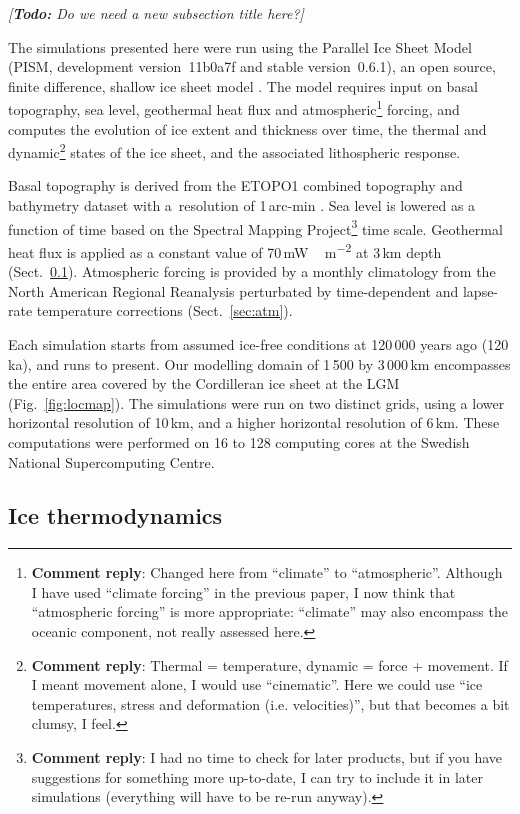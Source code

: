 \documentclass[tc, manuscript]{copernicus}
\newcommand{\renote}[1]{\footnote{\textbf{Comment reply}: #1}}
\newcommand{\todo}[1]{\emph{[\textbf{Todo:} #1]}}
\begin{document}
\todo{Do we need a new subsection title here?}

The simulations presented here were run using the Parallel Ice Sheet Model
(PISM, development version~11b0a7f and stable version~0.6.1), an open source,
finite difference, shallow ice sheet model \citep{PISM-authors.2014}. The model
requires input on basal topography, sea level, geothermal heat flux and
atmospheric\renote{
    Changed here from ``climate'' to ``atmospheric''. Although I have used
    ``climate forcing'' in the previous paper, I now think that ``atmospheric
    forcing'' is more appropriate: ``climate'' may also encompass the oceanic
    component, not really assessed here.}
forcing, and computes the evolution of ice extent
and thickness over time, the thermal and dynamic\renote{
    Thermal = temperature, dynamic = force + movement. If I meant movement
    alone, I would use ``cinematic''. Here we could use ``ice temperatures,
    stress and deformation (i.e. velocities)'', but that becomes a bit clumsy,
    I feel.}
states of the ice sheet, and the associated lithospheric response.

Basal topography is derived from the ETOPO1 combined topography and bathymetry
dataset with a~resolution of 1\,arc-min \citep{Amante.Eakins.2009}. Sea level
is lowered as a function of time based on the Spectral Mapping Project\renote{
    I had no time to check for later products, but if you have suggestions for
    something more up-to-date, I can try to include it in later simulations
    (everything will have to be re-run anyway).}
\citep[SPECMAP;][]{Imbrie.etal.1989} time scale. Geothermal heat flux
is applied as a constant value of 70\,\unit{mW\,m^{-2}} at 3\,km depth
(Sect.~\ref{sec:icedyn}). Atmospheric forcing is provided by a monthly
climatology from the North American Regional Reanalysis
\citep[NARR;][]{Mesinger.etal.2006} perturbated by time-dependent and
lapse-rate temperature corrections (Sect.~\ref{sec:atm}).

Each simulation starts from assumed ice-free conditions at 120\,000 years ago
(120\,ka), and runs to present. Our modelling domain of 1\,500 by 3\,000\,km
encompasses the entire area covered by the Cordilleran ice sheet at the LGM
(Fig.~\ref{fig:locmap}). The simulations were run on two distinct grids, using
a lower horizontal resolution of 10\,km, and a higher horizontal resolution of
6\,km. These computations were performed on 16 to 128 computing cores at the
Swedish National Supercomputing Centre.

\subsection{Ice thermodynamics}
\label{sec:icedyn}
\end{document}
